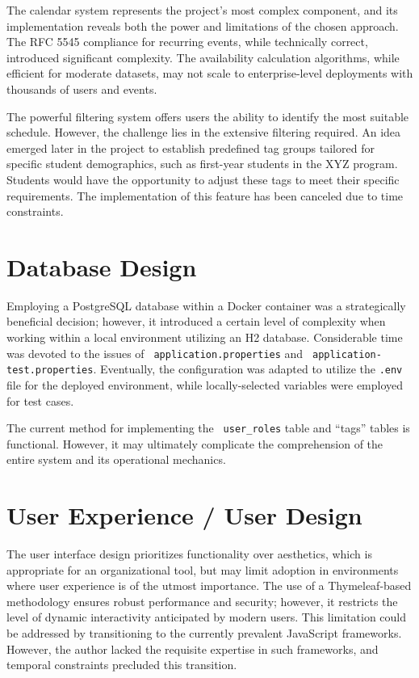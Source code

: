 The calendar system represents the project's most complex component, and its implementation reveals both the power and limitations of the chosen approach.
The RFC 5545 compliance for recurring events, while technically correct, introduced significant complexity.
The availability calculation algorithms, while efficient for moderate datasets, may not scale to enterprise-level deployments with thousands of users and events.

The powerful filtering system offers users the ability to identify the most suitable schedule.
However, the challenge lies in the extensive filtering required.
An idea emerged later in the project to establish predefined tag groups tailored for specific student demographics, such as first-year students in the XYZ program.
Students would have the opportunity to adjust these tags to meet their specific requirements.
The implementation of this feature has been canceled due to time constraints.


\section{Database Design}\label{sec:database-design2}

Employing a PostgreSQL database within a Docker container was a strategically beneficial decision; however, it introduced a certain level of complexity when working within a local environment utilizing an H2 database.
Considerable time was devoted to the issues of \texttt{ application.properties} and \texttt{ application-test.properties}.
Eventually, the configuration was adapted to utilize the \texttt{.env} file for the deployed environment, while locally-selected variables were employed for test cases.

The current method for implementing the \texttt{ user\_roles} table and ``tags'' tables is functional.
However, it may ultimately complicate the comprehension of the entire system and its operational mechanics.

\newpage

\section{User Experience / User Design}\label{sec:user-experience-/-user-design}

The user interface design prioritizes functionality over aesthetics, which is appropriate for an organizational tool, but may limit adoption in environments where user experience is of the utmost importance.
The use of a Thymeleaf-based methodology ensures robust performance and security; however, it restricts the level of dynamic interactivity anticipated by modern users.
This limitation could be addressed by transitioning to the currently prevalent JavaScript frameworks.
However, the author lacked the requisite expertise in such frameworks, and temporal constraints precluded this transition.

